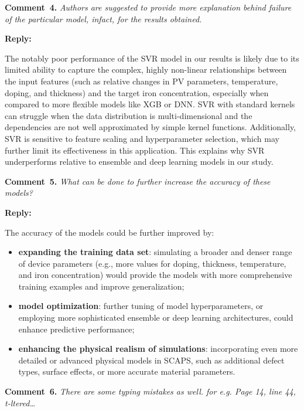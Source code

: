 \documentclass[a4paper,fleqn]{cas-sc}
\begin{document}
\vspace{1cm}
\noindent
\textcolor[rgb]{0.00,0.50,1.00}{\textbf{Comment~4.}}
\emph{Authors are suggested to provide more explanation behind failure of the particular model, infact, for the results obtained.}

\noindent
\textcolor[rgb]{0.51,0.00,0.00}{\textbf{Reply:}}

The notably poor performance of the SVR model in our results is likely due to its limited ability to capture the complex, highly non-linear relationships between the input features (such as relative changes in PV parameters, temperature, doping, and thickness) and the target iron concentration, especially when compared to more flexible models like XGB or DNN.
SVR with standard kernels can struggle when the data distribution is multi-dimensional and the dependencies are not well approximated by simple kernel functions.
Additionally, SVR is sensitive to feature scaling and hyperparameter selection, which may further limit its effectiveness in this application.
This explains why SVR underperforms relative to ensemble and deep learning models in our study.

\vspace{1cm}
\noindent
\textcolor[rgb]{0.00,0.50,1.00}{\textbf{Comment~5.}}
\emph{What can be done to further increase the accuracy of these models?}

\noindent
\textcolor[rgb]{0.51,0.00,0.00}{\textbf{Reply:}}

The accuracy of the models could be further improved by:
\begin{itemize}
    \item \textbf{expanding the training data set}: simulating a broader and denser range of device parameters (e.g., more values for doping, thickness, temperature, and iron concentration) would provide the models with more comprehensive training examples and improve generalization;
    \item \textbf{model optimization}: further tuning of model hyperparameters, or employing more sophisticated ensemble or deep learning architectures, could enhance predictive performance;
    \item \textbf{enhancing the physical realism of simulations}: incorporating even more detailed or advanced physical models in SCAPS, such as additional defect types, surface effects, or more accurate material parameters.
\end{itemize}


\vspace{1cm}
\noindent
\textcolor[rgb]{0.00,0.50,1.00}{\textbf{Comment~6.}}
\emph{There are some typing mistakes as well. for e.g. Page 14, line 44, t-ltered…}
\end{document}
